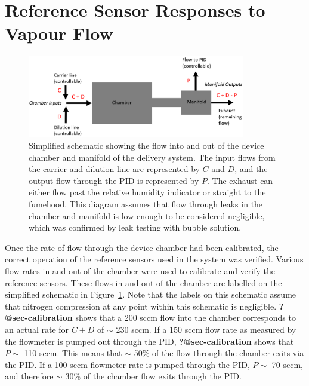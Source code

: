 \documentclass[
  a4paper,
]{scrbook}
\begin{document}
\hypertarget{sec-responses-to-vapour}{%
\section{Reference Sensor Responses to Vapour
Flow}\label{sec-responses-to-vapour}}

\begin{figure}

{\centering \includegraphics[width=0.85\textwidth,height=\textheight]{figures/ch9/chamber-manifold-v2.png}

}

\caption{\label{fig-chamber-schematic}Simplified schematic showing the
flow into and out of the device chamber and manifold of the delivery
system. The input flows from the carrier and dilution line are
represented by \(C\) and \(D\), and the output flow through the PID is
represented by \(P\). The exhaust can either flow past the relative
humidity indicator or straight to the fumehood. This diagram assumes
that flow through leaks in the chamber and manifold is low enough to be
considered negligible, which was confirmed by leak testing with bubble
solution.}

\end{figure}

Once the rate of flow through the device chamber had been calibrated,
the correct operation of the reference sensors used in the system was
verified. Various flow rates in and out of the chamber were used to
calibrate and verify the reference sensors. These flows in and out of
the chamber are labelled on the simplified schematic in
Figure~\ref{fig-chamber-schematic}. Note that the labels on this
schematic assume that nitrogen compression at any point within this
schematic is negligible. \textbf{?@sec-calibration} shows that a 200
sccm flow into the chamber corresponds to an actual rate for \(C + D\)
of \(\sim\) 230 sccm. If a 150 sccm flow rate as measured by the
flowmeter is pumped out through the PID, \textbf{?@sec-calibration}
shows that \(P \sim\) 110 sccm. This means that \(\sim\) 50\% of the
flow through the chamber exits via the PID. If a 100 sccm flowmeter rate
is pumped through the PID, \(P \sim\) 70 sccm, and therefore \(\sim\)
30\% of the chamber flow exits through the PID.
\end{document}
